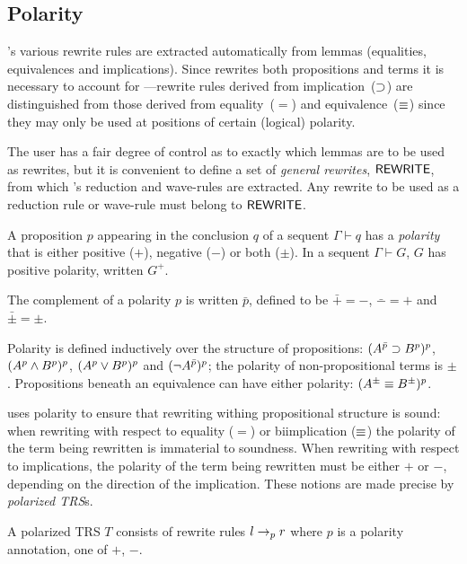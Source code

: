 \subsection {Polarity}
\label{sec:rrpol}
\clam's various rewrite rules are extracted automatically from lemmas
(equalities, equivalences and implications).  Since \clam rewrites
both propositions and terms it is necessary to account for
---rewrite rules derived from
implication~($\supset$) are distinguished from those derived from
equality~($=$) and equivalence~($\equiv$) since they may only be used
at positions of certain (logical) polarity.

The user has a fair degree of control as to exactly which lemmas are
to be used as rewrites, but it is convenient to define a set of {\em
general rewrites}, ${\sf REWRITE}$, from which \clam's reduction and
wave-rules are extracted.  Any rewrite to be used as a reduction rule
or wave-rule must belong to ${\sf REWRITE}$.

\begin{defn}[Polarity]
A proposition $p$ appearing in the conclusion $q$ of a sequent
$\Gamma\vdash q$ has a {\em polarity\/} that is either positive ($+$),
negative ($-$) or both (${\pm }$).  In a sequent $\Gamma \vdash G$, $G$
has positive polarity, written $G^+$.

The complement of a polarity $p$ is written $\bar{p}$, defined to be
$\bar{+}=-$, $\bar{-}=+$ and $\bar{\pm}=\pm$.  

Polarity is defined inductively over the structure of propositions:
$(A^{\bar{p}}\supset B^p)^p$, $(A^p\land B^p)^p$, $(A^p\lor B^p)^p$
and $(\neg A^{\bar{p}})^p$; the polarity of non-propositional terms
is $\pm$.  Propositions beneath an equivalence can have either
polarity: $(A^\pm\equiv B^\pm)^p$.
\end{defn}

\clam uses polarity to ensure that rewriting withing propositional
structure is sound:  when rewriting with respect to equality ($=$) or
biimplication ($\equiv$) the polarity of the term being rewritten is
immaterial to soundness.  When rewriting with respect to implications, 
the polarity of the term being rewritten must be either $+$ or $-$,
depending on the direction of the implication.  These notions are made 
precise by {\em polarized TRS\/}s.

\begin{defn}
A polarized TRS $T$ consists of rewrite rules $l\rightarrow_p r$ where
$p$ is a polarity annotation, one of $+$, $-$.
\end{defn}

